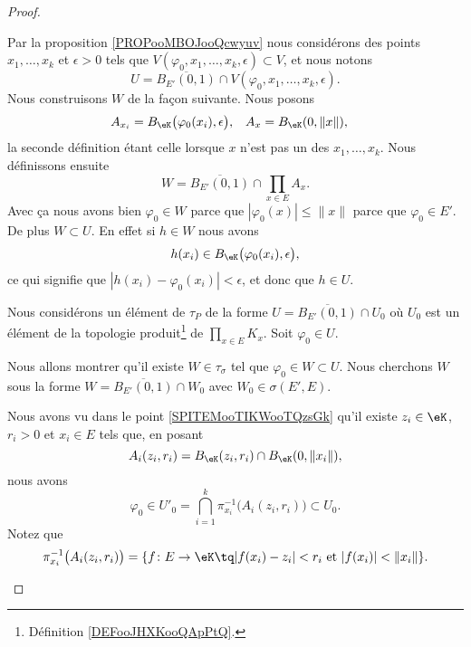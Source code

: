 \begin{proof}
\begin{subproof}
		Par la proposition \ref{PROPooMBOJooQcwyuv} nous considérons des points \( x_1,\ldots,x_k\) et \( \epsilon>0\) tels que \( V(\varphi_0,x_1,\ldots,x_k,\epsilon)\subset V\), et nous notons
		\begin{equation}
			U=\overline{B_{E'}(0,1)}\cap V(\varphi_0,x_1,\ldots,x_k,\epsilon).
		\end{equation}
		Nous construisons \( W\) de la façon suivante. Nous posons
		\begin{equation}
			\begin{aligned}[]
				A_{x_i} & =B_{\eK}\big( \varphi_0(x_i),\epsilon \big), & A_x & =B_{\eK}(0,\| x \|),
			\end{aligned}
		\end{equation}
		la seconde définition étant celle lorsque \( x\) n'est pas un des \( x_1,\ldots,x_k\). Nous définissons ensuite
		\begin{equation}
			W=\overline{B_{E'}(0,1)}\cap\prod_{x\in E}A_x.
		\end{equation}
		Avec ça nous avons bien \( \varphi_0\in W\) parce que \( | \varphi_0(x) |\leq\| x \|\) parce que \( \varphi_0\in E'\). De plus \( W\subset U\). En effet si \( h\in W\) nous avons
		\begin{equation}
			h(x_i)\in B_{\eK}\big( \varphi_0(x_i),\epsilon \big),
		\end{equation}
		ce qui signifie que \( | h(x_i)-\varphi_0(x_i) |<\epsilon\), et donc que \( h\in U\).

		Nous considérons un élément de \( \tau_P\) de la forme \( U=\overline{B_{E'}(0,1)}\cap U_0\) où \( U_0\) est un élément de la topologie produit\footnote{Définition \ref{DEFooJHXKooQApPtQ}.} de \( \prod_{x\in E}K_x\). Soit \( \varphi_0\in U\).

		Nous allons montrer qu'il existe \( W\in\tau_{\sigma}\) tel que \( \varphi_0\in W\subset U\). Nous cherchons \( W\) sous la forme \( W=\overline{B_{E'}(0,1)}\cap W_0\) avec \( W_0\in\sigma(E',E)\).

		Nous avons vu dans le point \ref{SPITEMooTIKWooTQzsGk} qu'il existe \( z_i\in \eK\), \( r_i>0\) et \( x_i\in E\) tels que, en posant
		\begin{equation}
			A_i(z_i,r_i)=B_{\eK}(z_i,r_i)\cap B_{\eK}(0,\| x_i \|),
		\end{equation}
		nous avons
		\begin{equation}
			\varphi_0\in U'_0=\bigcap_{i=1}^k\pi_{x_i}^{-1}\big( A_i(z_i,r_i) \big)\subset U_0.
		\end{equation}
		Notez que
		\begin{equation}
			\pi_{x_i}^{-1}\big( A_i(z_i,r_i) \big)=\{f \colon E\to \eK \tq | f(x_i)-z_i |<r_i\text{ et }| f(x_i) |<\| x_i \|  \}.
		\end{equation}


\end{subproof}
\end{proof}
